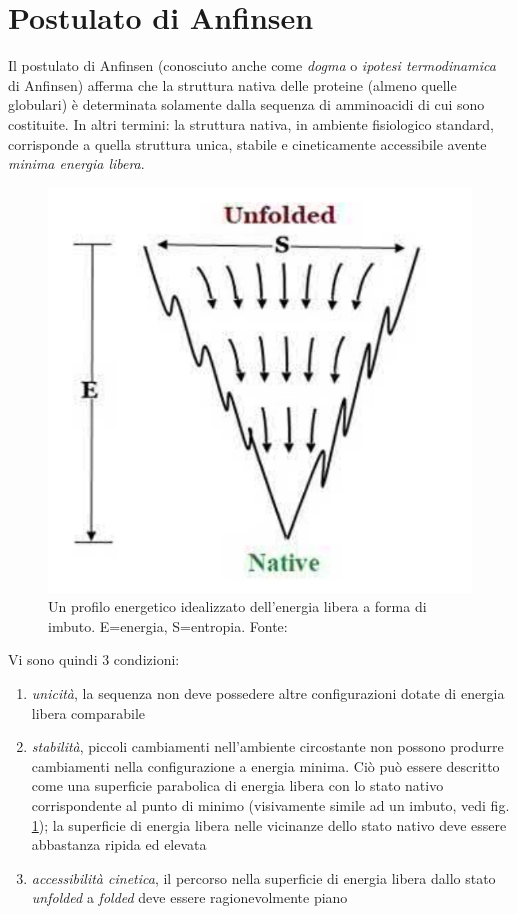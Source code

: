 \section{Postulato di Anfinsen}
{
Il postulato di Anfinsen (conosciuto anche come \textit{dogma} o \textit{ipotesi termodinamica} di Anfinsen) afferma che la struttura nativa delle proteine (almeno quelle globulari) è determinata solamente dalla sequenza di amminoacidi di cui sono costituite. In altri termini: la struttura nativa, in ambiente fisiologico standard, corrisponde a quella struttura unica, stabile e cineticamente accessibile avente \textit{minima energia libera}. 

\begin{figure}[h]
	\centering
	\includegraphics[scale=0.3]{images/funnel-folding.png}
	\caption{Un profilo energetico idealizzato dell'energia libera a forma di imbuto. E=energia, S=entropia. Fonte: \cite{pal2019fundamentals}}
	\label{fig:funnel}
\end{figure}

Vi sono quindi 3 condizioni:

\begin{enumerate}
	\item \textit{unicità}, la sequenza non deve possedere altre configurazioni dotate di energia libera comparabile
	\item \textit{stabilità}, piccoli cambiamenti nell'ambiente circostante non possono produrre cambiamenti nella configurazione a energia minima. Ciò può essere descritto come una superficie parabolica di energia libera con lo stato nativo corrispondente al punto di minimo (visivamente simile ad un imbuto, vedi fig. \ref{fig:funnel}); la superficie di energia libera nelle vicinanze dello stato nativo deve essere abbastanza ripida ed elevata
	\item \textit{accessibilità cinetica}, il percorso nella superficie di energia libera dallo stato \textit{unfolded} a \textit{folded} deve essere ragionevolmente piano
\end{enumerate}


}
